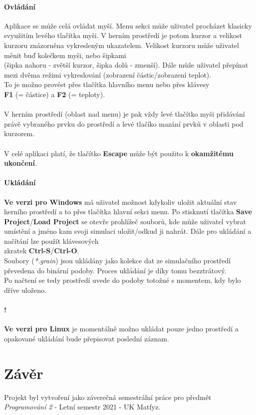 \documentclass[a4paper, 12pt]{article}
\begin{document}
\paragraph{Ovládání}
Aplikace se může celá ovládat myší. Menu sekci může uživatel procházet klasicky
svyužitím levého tlačítka myši. V herním prostředí je potom kurzor a velikost
kurzoru znázorněna vykresleným ukazatelem. Velikost kurzoru může uživatel měnit
buď kolečkem myši, nebo šipkami \\(šipka nahoru - zvětší kurzor,
šipka dolů - zmenší). Dále může uživatel přepínat mezi dvěma režimi vykreslování (zobrazení
částic/zobrazení teplot). \\To je možno provést přes tlačítka hlavního menu nebo
přes klávesy \\\textbf{F1} (= částice) a \textbf{F2} (= teploty).

\paragraph{}
V herním prostředí (oblast nad menu) je pak vždy levé tlačítko myši přidávání
právě vybraného prvku do prostředí a levé tlačíko mazání prvků v oblasti pod
kurzorem. 

\paragraph{}
V celé aplikaci platí, že tlačítko \textbf{Escape} může být použito k \textbf{okamžitému
ukončení}.

\paragraph{Ukládání}
\textbf{Ve verzi pro Windows} má uživatel možnost kdykoliv uložit aktuální stav 
herního prostředí a to přes tlačítka hlavní sekci menu. Po stisknutí tlačítka
\textbf{Save Project}/\textbf{Load Project} se otevře prohlížeč souborů, kde
může uživatel vybrat umístění a jméno kam svoji simulaci uložit/odkud ji
nahrát. Dále pro ukládání a načítání lze použít klávesových\\ zkratek
\textbf{Ctrl-S}/\textbf{Ctrl-O}.\\

Soubory (\emph{*.grain}) jsou ukládány jako kolekce dat ze simulačního prostředí převedena do
binární podoby. Proces ukládání je díky tomu bezztrátový. \\Po načtení se tedy
prostředí uvede do podoby totožné s momentem, kdy bylo dříve uloženo.

\paragraph{!}
\textbf{Ve verzi pro Linux} je momentálně možno ukládat pouze jedno prostředí a
opakované ukládání bude přepisovat poslední záznam.

\section{Závěr}
Projekt byl vytvoření jako záverečná semestrální práce pro předmět
\\\emph{Programování 2} - Letní semestr 2021 - UK Matfyz.
\end{document}
